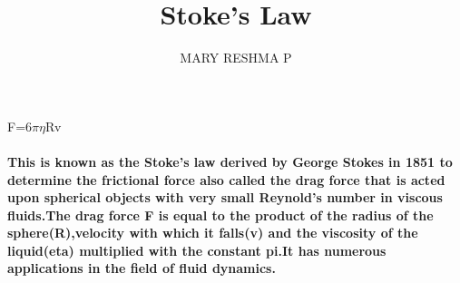 \documentclass{article}
\title{Stoke's Law}
\author{MARY RESHMA P}
\begin{document}
\maketitle
\begin{center}
F=6${\pi}$${\eta}${R}{v}
\end{center}

\paragraph{This is known as the Stoke's law derived by George Stokes in 1851 to determine the frictional force also called the drag force that is acted upon spherical objects with very small Reynold's number in viscous fluids.The drag force F is equal to the product of the radius of the sphere(R),velocity with which it falls(v) and the viscosity of the liquid(eta) multiplied with the constant pi.It has numerous applications in the field of fluid dynamics.}
\end{document}
